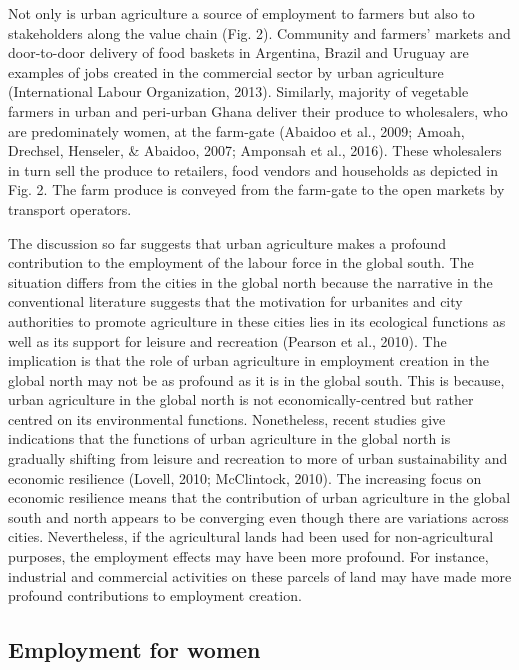 Not only is urban agriculture a source of employment to farmers but also to stakeholders along the value chain (Fig. 2). Community and farmers' markets and door-to-door delivery of food baskets in Argentina, Brazil and Uruguay are examples of jobs created in the commercial sector by urban agriculture (International Labour Organization, 2013). Similarly, majority of vegetable farmers in urban and peri-urban Ghana deliver their produce to wholesalers, who are predominately women, at the farm-gate (Abaidoo et al., 2009; Amoah, Drechsel, Henseler, \& Abaidoo, 2007; Amponsah et al., 2016). These wholesalers in turn sell the produce to retailers, food vendors and households as depicted in Fig. 2. The farm produce is conveyed from the farm-gate to the open markets by transport operators.

The discussion so far suggests that urban agriculture makes a profound contribution to the employment of the labour force in the global south. The situation differs from the cities in the global north because the narrative in the conventional literature suggests that the motivation for urbanites and city authorities to promote agriculture in these cities lies in its ecological functions as well as its support for leisure and recreation (Pearson et al., 2010). The implication is that the role of urban agriculture in employment creation in the global north may not be as profound as it is in the global south. This is because, urban agriculture in the global north is not economically-centred but rather centred on its environmental functions. Nonetheless, recent studies give indications that the functions of urban agriculture in the global north is gradually shifting from leisure and recreation to more of urban sustainability and economic resilience (Lovell, 2010; McClintock, 2010). The increasing focus on economic resilience means that the contribution of urban agriculture in the global south and north appears to be converging even though there are variations across cities. Nevertheless, if the agricultural lands had been used for non-agricultural purposes, the employment effects may have been more profound. For instance, industrial and commercial activities on these parcels of land may have made more profound contributions to employment creation.

\subsection{Employment for women}

